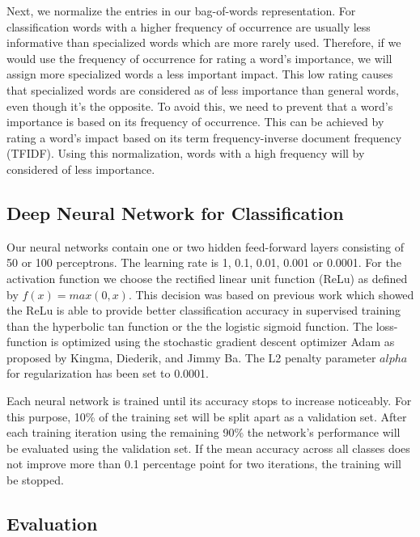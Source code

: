 \documentclass[sigconf]{acmart}
\begin{document}

Next, we normalize the entries in our bag-of-words representation. For classification words with a higher frequency of occurrence are usually less informative than specialized words which are more rarely used. Therefore, if we would use the frequency of occurrence for rating a word's importance, we will assign more specialized words a less important impact. This low rating causes that specialized words are considered as of less importance than general words, even though it's the opposite. To avoid this, we need to prevent that a word's importance is based on its frequency of occurrence. This can be achieved by rating a word's impact based on its term frequency-inverse document frequency (TFIDF). Using this normalization, words with a high frequency will by considered of less importance.

\subsection{Deep Neural Network for Classification}

Our neural networks contain one or two hidden feed-forward layers consisting of 50 or 100 perceptrons. The learning rate is 1, 0.1, 0.01, 0.001 or 0.0001. For the activation function we choose the rectified linear unit function (ReLu) as defined by $f(x) = max(0, x)$. This decision was based on previous work which showed the ReLu is able to provide better classification accuracy in supervised training than the hyperbolic tan function or the the logistic sigmoid function\cite{pmlr-v15-glorot11a}. The loss-function is optimized using the stochastic gradient descent optimizer Adam as proposed by Kingma, Diederik, and Jimmy Ba\cite{adam}. The L2 penalty parameter $alpha$ for regularization has been set to 0.0001.

Each neural network is trained until its accuracy stops to increase noticeably. For this purpose, 10\% of the training set will be split apart as a validation set. After each training iteration using the remaining 90\% the network's performance will be evaluated using the validation set. If the mean accuracy across all classes does not improve more than 0.1 percentage point for two iterations, the training will be stopped. 

\subsection{Evaluation}
\end{document}
